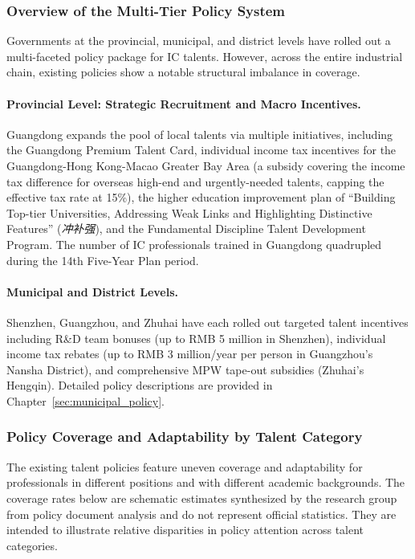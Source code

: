 \documentclass[12pt,a4paper]{article}
\begin{document}
\subsubsection{Overview of the Multi-Tier Policy System}

Governments at the provincial, municipal, and district levels have rolled out
a multi-faceted policy package for IC talents. However, across the entire
industrial chain, existing policies show a notable structural imbalance in
coverage.

\paragraph{Provincial Level: Strategic Recruitment and Macro Incentives.}
Guangdong expands the pool of local talents via multiple initiatives, including
the Guangdong Premium Talent Card, individual income tax incentives for the
Guangdong-Hong Kong-Macao Greater Bay Area (a subsidy covering the income tax
difference for overseas high-end and urgently-needed talents, capping the
effective tax rate at 15\%), the higher education improvement plan of
``Building Top-tier Universities, Addressing Weak Links and Highlighting
Distinctive Features'' (\textit{冲补强}), and the Fundamental Discipline
Talent Development Program. The number of IC professionals trained in Guangdong
quadrupled during the 14th Five-Year Plan period.

\paragraph{Municipal and District Levels.}
Shenzhen, Guangzhou, and Zhuhai have each rolled out targeted talent incentives
including R\&D team bonuses (up to RMB 5 million in Shenzhen), individual income
tax rebates (up to RMB 3 million/year per person in Guangzhou's Nansha District),
and comprehensive MPW tape-out subsidies (Zhuhai's Hengqin). Detailed policy
descriptions are provided in Chapter~\ref{sec:municipal_policy}.

\subsubsection{Policy Coverage and Adaptability by Talent Category}

The existing talent policies feature uneven coverage and adaptability for
professionals in different positions and with different academic backgrounds.
{\footnotesize The coverage rates below are schematic estimates synthesized by
the research group from policy document analysis and do not represent official
statistics. They are intended to illustrate relative disparities in policy
attention across talent categories.}
\end{document}
